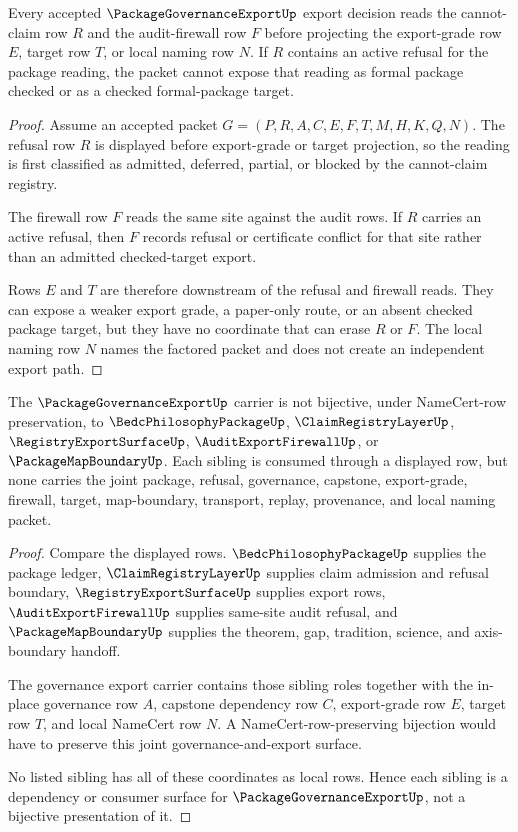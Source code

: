 \begin{theorem}
\label{thm:package-governance-export-refusal-totality}
Every accepted $\PackageGovernanceExportUp$ export decision reads the cannot-claim row $R$ and the audit-firewall row $F$ before projecting the export-grade row $E$, target row $T$, or local naming row $N$. If $R$ contains an active refusal for the package reading, the packet cannot expose that reading as formal package checked or as a checked formal-package target.
\end{theorem}
\begin{proof}
Assume an accepted packet $G=(P,R,A,C,E,F,T,M,H,K,Q,N)$. The refusal row $R$ is displayed before export-grade or target projection, so the reading is first classified as admitted, deferred, partial, or blocked by the cannot-claim registry.

The firewall row $F$ reads the same site against the audit rows. If $R$ carries an active refusal, then $F$ records refusal or certificate conflict for that site rather than an admitted checked-target export.

Rows $E$ and $T$ are therefore downstream of the refusal and firewall reads. They can expose a weaker export grade, a paper-only route, or an absent checked package target, but they have no coordinate that can erase $R$ or $F$. The local naming row $N$ names the factored packet and does not create an independent export path.
\end{proof}

\begin{theorem}
\label{thm:package-governance-export-sibling-independence}
The $\PackageGovernanceExportUp$ carrier is not bijective, under NameCert-row preservation, to $\BedcPhilosophyPackageUp$, $\ClaimRegistryLayerUp$, $\RegistryExportSurfaceUp$, $\AuditExportFirewallUp$, or $\PackageMapBoundaryUp$. Each sibling is consumed through a displayed row, but none carries the joint package, refusal, governance, capstone, export-grade, firewall, target, map-boundary, transport, replay, provenance, and local naming packet.
\end{theorem}
\begin{proof}
Compare the displayed rows. $\BedcPhilosophyPackageUp$ supplies the package ledger, $\ClaimRegistryLayerUp$ supplies claim admission and refusal boundary, $\RegistryExportSurfaceUp$ supplies export rows, $\AuditExportFirewallUp$ supplies same-site audit refusal, and $\PackageMapBoundaryUp$ supplies the theorem, gap, tradition, science, and axis-boundary handoff.

The governance export carrier contains those sibling roles together with the in-place governance row $A$, capstone dependency row $C$, export-grade row $E$, target row $T$, and local NameCert row $N$. A NameCert-row-preserving bijection would have to preserve this joint governance-and-export surface.

No listed sibling has all of these coordinates as local rows. Hence each sibling is a dependency or consumer surface for $\PackageGovernanceExportUp$, not a bijective presentation of it.
\end{proof}

